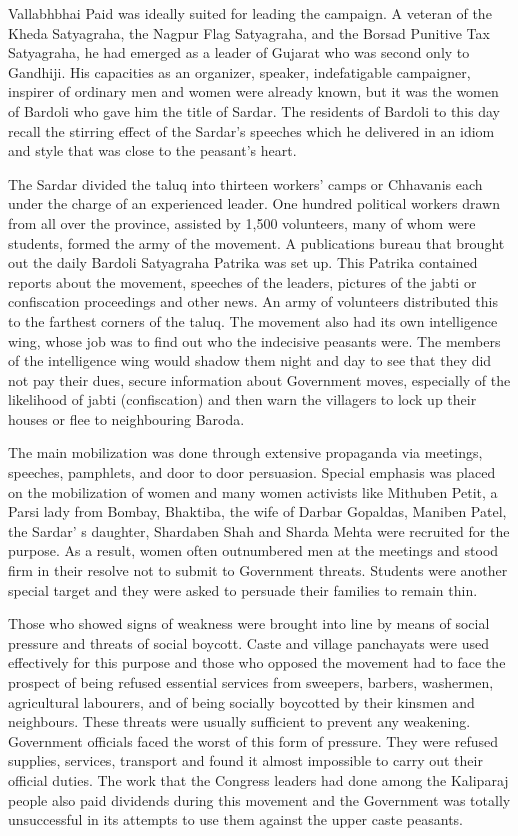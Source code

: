 \begin{multicols}{2}
Vallabhbhai Paid was ideally suited for leading the campaign. A veteran of the Kheda Satyagraha, the Nagpur Flag Satyagraha, and the Borsad Punitive Tax Satyagraha, he had emerged as a leader of Gujarat who was second only to Gandhiji. His capacities as an organizer, speaker, indefatigable campaigner, inspirer of ordinary men and women were already known, but it was the women of Bardoli who gave him the title of Sardar. The residents of Bardoli to this day recall the stirring effect of the Sardar's speeches which he delivered in an idiom and style that was close to the peasant's heart.

The Sardar divided the taluq into thirteen workers' camps or Chhavanis each under the charge of an experienced leader. One hundred political workers drawn from all over the province, assisted by 1,500 volunteers, many of whom were students, formed the army of the movement. A publications bureau that brought out the daily Bardoli Satyagraha Patrika was set up. This Patrika contained reports about the movement, speeches of the leaders, pictures of the jabti or confiscation proceedings and other news. An army of volunteers distributed this to the farthest corners of the taluq. The movement also had its own intelligence wing, whose job was to find out who the indecisive peasants were. The members of the intelligence wing would shadow them night and day to see that they did not pay their dues, secure information about Government moves, especially of the likelihood of jabti (confiscation) and then warn the villagers to lock up their houses or flee to neighbouring Baroda.

The main mobilization was done through extensive propaganda via meetings, speeches, pamphlets, and door to door persuasion. Special emphasis was placed on the mobilization of women and many women activists like Mithuben Petit, a Parsi lady from Bombay, Bhaktiba, the wife of Darbar Gopaldas, Maniben Patel, the Sardar' s daughter, Shardaben Shah and Sharda Mehta were recruited for the purpose. As a result, women often outnumbered men at the meetings and stood firm in their resolve not to submit to Government threats. Students were another special target and they were asked to persuade their families to remain thin.

Those who showed signs of weakness were brought into line by means of social pressure and threats of social boycott. Caste and village panchayats were used effectively for this purpose and those who opposed the movement had to face the prospect of being refused essential services from sweepers, barbers, washermen, agricultural labourers, and of being socially boycotted by their kinsmen and neighbours. These threats were usually sufficient to prevent any weakening. Government officials faced the worst of this form of pressure. They were refused supplies, services, transport and found it almost impossible to carry out their official duties. The work that the Congress leaders had done among the Kaliparaj people also paid dividends during this movement and the Government was totally unsuccessful in its attempts to use them against the upper caste peasants.


\end{multicols}
